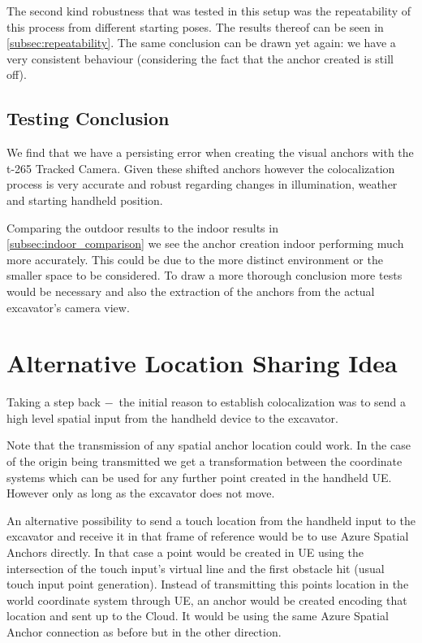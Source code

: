 The second kind robustness that was tested in this setup was the repeatability of this process from different starting poses. The results thereof can be seen in \cref{subsec:repeatability}. The same conclusion can be drawn yet again: we have a very consistent behaviour (considering the fact that the anchor created is still off).

\subsection*{Testing Conclusion}\label{subsec:testing_conclusion}

We find that we have a persisting error when creating the visual anchors with the t-265 Tracked Camera. Given these shifted anchors however the colocalization process is very accurate and robust regarding changes in illumination, weather and starting handheld position.

Comparing the outdoor results to the indoor results in \cref{subsec:indoor_comparison} we see the anchor creation indoor performing much more accurately. This could be due to the more distinct environment or the smaller space to be considered. To draw a more thorough conclusion more tests would be necessary and also the extraction of the anchors from the actual excavator's camera view.

\section*{Alternative Location Sharing Idea}\label{sec:alternative_location_transfer}

Taking a step back $-$ the initial reason to establish colocalization was to send a high level spatial input from the handheld device to the excavator.

Note that the transmission of any spatial anchor location could work. In the case of the origin being transmitted we get a transformation between the coordinate systems which can be used for any further point created in the handheld UE. However only as long as the excavator does not move. 

An alternative possibility to send a touch location from the handheld input to the excavator and receive it in that frame of reference would be to use Azure Spatial Anchors directly. In that case a point would be created in UE using the intersection of the touch input's virtual line and the first obstacle hit (usual touch input point generation). Instead of transmitting this points location in the world coordinate system through UE, an anchor would be created encoding that location and sent up to the Cloud. It would be using the same Azure Spatial Anchor connection as before but in the other direction. 